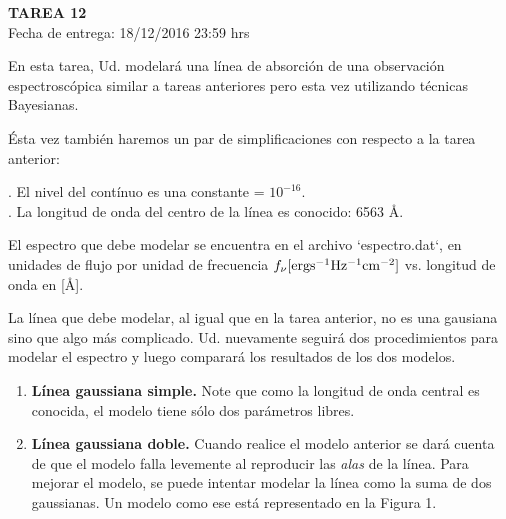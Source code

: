 \documentclass[letter, 11pt]{article}
\newcommand{\tareanro}{12}
\newcommand{\fechaentrega}{18/12/2016 23:59 hrs}
\begin{document}
\thispagestyle{firstpage}

\begin{center}
  {\uppercase{\LARGE \bf Tarea \tareanro}}\\
  Fecha de entrega: \fechaentrega
\end{center}



En esta tarea, Ud. modelará una línea de absorción de una observación
espectroscópica similar a tareas anteriores pero esta vez utilizando técnicas
Bayesianas.

Ésta vez también haremos un par de simplificaciones con respecto a la tarea
anterior:

. El nivel del contínuo es una constante = $10^{-16}$.\\
. La longitud de onda del centro de la línea es conocido: 6563 \AA.

El espectro que debe modelar se encuentra en el archivo `espectro.dat`, en
unidades de flujo por unidad de frecuencia $f_\nu {\rm[erg s^{-1} Hz^{-1}
cm^{-2}]}$ vs. longitud de onda en [\AA].

La línea que debe modelar, al igual que en la tarea anterior, no es una
gausiana sino que algo más complicado. Ud. nuevamente seguirá dos
procedimientos para modelar el espectro y luego comparará los resultados de los
dos modelos.

\begin{enumerate}

  \item {\bf Línea gaussiana simple.} Note que como la longitud de onda central
    es conocida, el modelo tiene sólo dos parámetros libres.

  \item {\bf Línea gaussiana doble.} Cuando realice el modelo anterior se dará
    cuenta de que el modelo falla levemente al reproducir las \emph{alas} de la
    línea. Para mejorar el modelo, se puede intentar modelar la línea como la
    suma de dos gaussianas. Un modelo como ese está representado en la
    Figura 1.

\end{enumerate}
\end{document}
